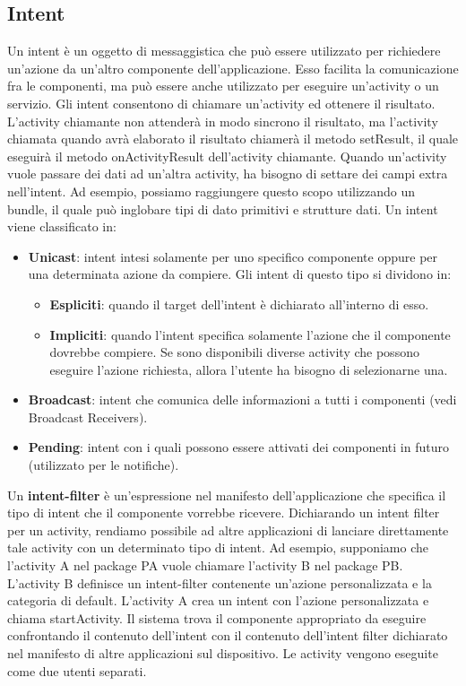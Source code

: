 \subsection{Intent}
Un intent è un oggetto di messaggistica che può essere utilizzato per richiedere un'azione da un'altro componente dell'applicazione.
Esso facilita la comunicazione fra le componenti, ma può essere anche utilizzato per eseguire un'activity o un servizio.
Gli intent consentono di chiamare un'activity ed ottenere il risultato.
L'activity chiamante non attenderà in modo sincrono il risultato, ma l'activity chiamata quando avrà elaborato il risultato chiamerà il metodo setResult, il quale eseguirà il metodo onActivityResult dell'activity chiamante.
Quando un'activity vuole passare dei dati ad un'altra activity, ha bisogno di settare dei campi extra nell'intent.
Ad esempio, possiamo raggiungere questo scopo utilizzando un bundle, il quale può inglobare tipi di dato primitivi e strutture dati. Un intent viene classificato in:
\begin{itemize}
    \item \textbf{Unicast}: intent intesi solamente per uno specifico componente oppure per una determinata azione da compiere. Gli intent di questo tipo si dividono in:
          \begin{itemize}
              \item \textbf{Espliciti}: quando il target dell'intent è dichiarato all'interno di esso.
              \item \textbf{Impliciti}: quando l'intent specifica solamente l'azione che il componente dovrebbe compiere. Se sono disponibili diverse activity che possono eseguire l'azione richiesta, allora l'utente ha bisogno di selezionarne una.
          \end{itemize}
    \item \textbf{Broadcast}: intent che comunica delle informazioni a tutti i componenti (vedi Broadcast Receivers).
    \item \textbf{Pending}: intent con i quali possono essere attivati dei componenti in futuro (utilizzato per le notifiche).
\end{itemize}

Un \textbf{intent-filter} è un'espressione nel manifesto dell'applicazione che specifica il tipo di intent che il componente vorrebbe ricevere.
Dichiarando un intent filter per un activity, rendiamo possibile ad altre applicazioni di lanciare direttamente tale activity con un determinato tipo di intent.
Ad esempio, supponiamo che l'activity A nel package PA vuole chiamare l'activity B nel package PB.
L'activity B definisce un intent-filter contenente un'azione personalizzata e la categoria di default.
L'activity A crea un intent con l'azione personalizzata e chiama startActivity.
Il sistema trova il componente appropriato da eseguire confrontando il contenuto dell'intent con il contenuto dell'intent filter dichiarato nel manifesto di altre applicazioni sul dispositivo.
Le activity vengono eseguite come due utenti separati.

